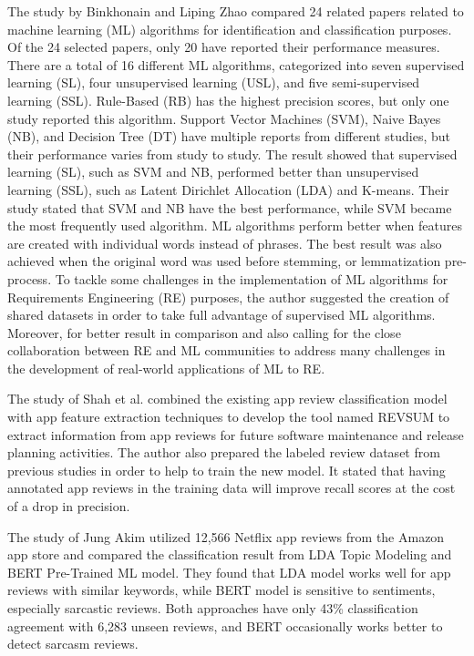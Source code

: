 \documentclass[12pt]{article}
\begin{document}
The study by Binkhonain and Liping Zhao \cite{review_ml} compared 24 related papers related to machine learning (ML) algorithms for identification and classification purposes. Of the 24 selected papers, only 20 have reported their performance measures. There are a total of 16 different ML algorithms, categorized into seven supervised learning (SL), four unsupervised learning (USL), and five semi-supervised learning (SSL). Rule-Based (RB) has the highest precision scores, but only one study reported this algorithm. Support Vector Machines (SVM), Naive Bayes (NB), and Decision Tree (DT) have multiple reports from different studies, but their performance varies from study to study. The result showed that supervised learning (SL), such as SVM and NB, performed better than unsupervised learning (SSL), such as Latent Dirichlet Allocation (LDA) and K-means. Their study stated that SVM and NB have the best performance, while SVM became the most frequently used algorithm. ML algorithms perform better when features are created with individual words instead of phrases. The best result was also achieved when the original word was used before stemming, or lemmatization pre-process. To tackle some challenges in the implementation of ML algorithms for Requirements Engineering (RE) purposes, the author suggested the creation of shared datasets in order to take full advantage of supervised ML algorithms. Moreover, for better result in comparison and also calling for the close collaboration between RE and ML communities to address many challenges in the development of real-world applications of ML to RE.

The study of Shah et al. \cite{faiz_ali} combined the existing app review classification model with app feature extraction techniques to develop the tool named REVSUM to extract information from app reviews for future software maintenance and release planning activities. The author also prepared the labeled review dataset from previous studies in order to help to train the new model. It stated that having annotated app reviews in the training data will improve recall scores at the cost of a drop in precision.

The study of Jung Akim \cite{jung_kim} utilized 12,566 Netflix app reviews from the Amazon app store and compared the classification result from LDA Topic Modeling and BERT Pre-Trained ML model. They found that LDA model works well for app reviews with similar keywords, while BERT model is sensitive to sentiments, especially sarcastic reviews. Both approaches have only 43\% classification agreement with 6,283 unseen reviews, and BERT occasionally works better to detect sarcasm reviews.
\end{document}
